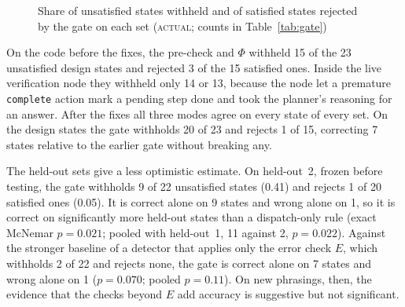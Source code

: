 \begin{figure}[h]
\centering
{}
\caption{Share of unsatisfied states withheld and of satisfied states rejected by the gate on each set (\textsc{actual}; counts in Table~\ref{tab:gate})}
\label{fig:gatechart}
\end{figure}

On the code before the fixes, the pre-check and $\Phi$ withheld 15 of the 23 unsatisfied design states and rejected 3 of the 15 satisfied ones. Inside the live verification node they withheld only 14 or 13, because the node let a premature \texttt{complete} action mark a pending step done and took the planner's reasoning for an answer. After the fixes all three modes agree on every state of every set. On the design states the gate withholds 20 of 23 and rejects 1 of 15, correcting 7 states relative to the earlier gate without breaking any.

The held-out sets give a less optimistic estimate. On held-out~2, frozen before testing, the gate withholds 9 of 22 unsatisfied states (0.41) and rejects 1 of 20 satisfied ones (0.05). It is correct alone on 9 states and wrong alone on 1, so it is correct on significantly more held-out states than a dispatch-only rule (exact McNemar $p=0.021$; pooled with held-out~1, 11 against 2, $p=0.022$). Against the stronger baseline of a detector that applies only the error check $E$, which withholds 2 of 22 and rejects none, the gate is correct alone on 7 states and wrong alone on 1 ($p=0.070$; pooled $p=0.11$). On new phrasings, then, the evidence that the checks beyond $E$ add accuracy is suggestive but not significant.


